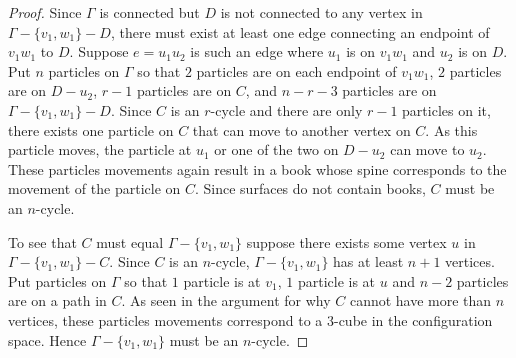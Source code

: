 \begin{proof}
Since \(\Gamma\) is connected but \(D\) is not connected to any vertex in \(\Gamma - \{v_1, w_1\} - D\),
there must exist at least one edge connecting an endpoint of \(v_1 w_1\) to \(D\).
Suppose \(e = u_1 u_2\) is such an edge where \(u_1\) is on \(v_1 w_1\) and \(u_2\) is on \(D\).
Put \(n\) particles on \(\Gamma\) so that \(2\) particles are on each endpoint of \(v_1 w_1\), 
\(2\) particles are on \(D - u_2\), 
\(r - 1\) particles are on \(C\), and \(n - r - 3\) particles are on \(\Gamma - \{v_1, w_1\} - D\).
Since \(C\) is an \(r\)-cycle and there are only \(r - 1\) particles on it, 
there exists one particle on \(C\) that can move to another vertex on \(C\).
As this particle moves, the particle at \(u_1\) or one of the two on \(D - u_2\) can move to \(u_2\).
These particles movements again result in a book whose spine corresponds to the movement of the particle on \(C\).
Since surfaces do not contain books, \(C\) must be an \(n\)-cycle.

To see that \(C\) must equal \(\Gamma - \{v_1, w_1\}\) suppose there exists some vertex \(u\) in \(\Gamma - \{v_1, w_1\} - C\).
Since \(C\) is an \(n\)-cycle, \(\Gamma - \{v_1, w_1\}\) has at least \(n + 1\) vertices.
Put particles on \(\Gamma\) so that \(1\) particle is at \(v_1\), \(1\) particle is at \(u\) and \(n-2\) particles are on a path in \(C\).
As seen in the argument for why \(C\) cannot have more than \(n\) vertices, these particles movements correspond to a \(3\)-cube in the configuration
space. Hence \(\Gamma - \{v_1, w_1\}\) must be an \(n\)-cycle.
\end{proof}

